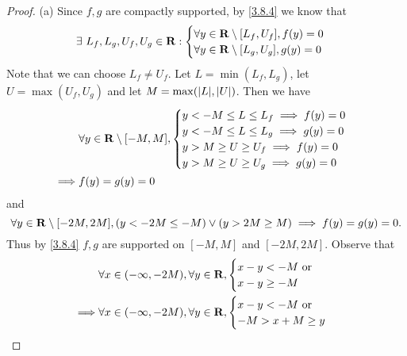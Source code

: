 \begin{proof}{(a)}
  Since \(f, g\) are compactly supported, by \cref{3.8.4} we know that
  \[
    \exists\ L_f, L_g, U_f, U_g \in \mathbf{R} : \begin{cases}
      \forall y \in \mathbf{R} \setminus [L_f, U_f], f(y) = 0 \\
      \forall y \in \mathbf{R} \setminus [L_g, U_g], g(y) = 0
    \end{cases}
  \]
  Note that we can choose \(L_f \neq U_f\).
  Let \(L = \min(L_f, L_g)\), let \(U = \max(U_f, U_g)\) and let \(M = \max(\abs{L}, \abs{U})\).
  Then we have
  \begin{align*}
             & \forall y \in \mathbf{R} \setminus [-M, M], \begin{cases}
                                                     y < -M \leq L \leq L_f \implies f(y) = 0 \\
                                                     y < -M \leq L \leq L_g \implies g(y) = 0 \\
                                                     y > M \geq U \geq U_f \implies f(y) = 0  \\
                                                     y > M \geq U \geq U_g \implies g(y) = 0
                                                   \end{cases} \\
    \implies & f(y) = g(y) = 0
  \end{align*}
  and
  \[
    \forall y \in \mathbf{R} \setminus [-2M, 2M], (y < -2M \leq -M) \lor (y > 2M \geq M) \implies f(y) = g(y) = 0.
  \]
  Thus by \cref{3.8.4} \(f, g\) are supported on \([-M, M]\) and \([-2M, 2M]\).
  Observe that
  \begin{align*}
             & \forall x \in (-\infty, -2M), \forall y \in \mathbf{R}, \begin{cases}
                                                                 x - y < -M \text{ or } \\
                                                                 x - y \geq -M
                                                               \end{cases}                      \\
    \implies & \forall x \in (-\infty, -2M), \forall y \in \mathbf{R}, \begin{cases}
                                                                 x - y < -M \text{ or } \\
                                                                 -M > x + M \geq y

\end{cases}
\end{align*}
\end{proof}
